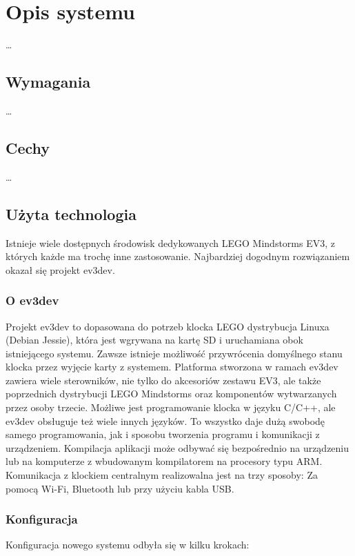 \chapter{Opis systemu}
\label{ch:opis_systemu}

\ldots

\section{Wymagania}

\ldots

\section{Cechy}

\ldots

\section{Użyta technologia}

Istnieje wiele dostępnych środowisk dedykowanych LEGO Mindstorms EV3, z których każde ma trochę inne zastosowanie. Najbardziej dogodnym rozwiązaniem okazał się projekt ev3dev.

\subsection{O ev3dev}
Projekt ev3dev to dopasowana do potrzeb klocka LEGO dystrybucja Linuxa (Debian Jessie), która jest wgrywana na kartę SD i uruchamiana obok istniejącego systemu. Zawsze istnieje możliwość przywrócenia domyślnego stanu klocka przez wyjęcie karty z systemem. Platforma stworzona w ramach ev3dev zawiera wiele sterowników, nie tylko do akcesoriów zestawu EV3, ale także poprzednich dystrybucji LEGO Mindstorms oraz komponentów wytwarzanych przez osoby trzecie. Możliwe jest programowanie klocka w języku C/C++, ale ev3dev obsługuje też wiele innych języków. To wszystko daje dużą swobodę samego programowania, jak i sposobu tworzenia programu i komunikacji z urządzeniem. Kompilacja aplikacji może odbywać się bezpośrednio na urządzeniu lub na komputerze z wbudowanym kompilatorem na procesory typu ARM. Komunikacja z klockiem centralnym realizowalna jest na trzy sposoby: Za pomocą Wi-Fi, Bluetooth lub przy użyciu kabla USB.

\subsection{Konfiguracja}
Konfiguracja nowego systemu odbyła się w kilku krokach:

